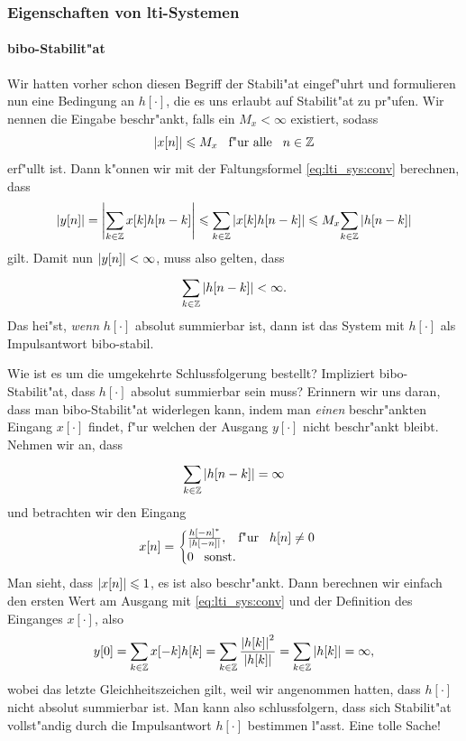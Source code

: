 \subsubsection{Eigenschaften von \texorpdfstring{\acrshort*{lti}}{LTI}-Systemen}\label{sec:lti_sys:properties}
%
\paragraph{\texorpdfstring{\gls{bibo}}{BIBO}-Stabilit"at}
Wir hatten vorher schon diesen Begriff der Stabili"at eingef"uhrt und formulieren nun eine Bedingung an $h[\cdot]$, die es uns erlaubt auf Stabilit"at zu pr"ufen.
Wir nennen die Eingabe beschr"ankt, falls ein $M_x < \infty$ existiert, sodass
\[
{\left| x[n] \right|} \leqslant M_x {\hspace{3mm} \text{f"ur alle} \hspace{3mm}} n \in \mathbb{Z}
\]
erf"ullt ist.
Dann k"onnen wir mit der Faltungsformel \eqref{eq:lti_sys:conv} berechnen, dass
\[
{\left| y[n] \right|} 
    = {\left| {\sum\limits_{k\in\mathbb{Z}}^{}{x[k] h[n-k]}} \right|} 
    \leqslant {\sum\limits_{k\in\mathbb{Z}}^{}{{\left| x[k] h[n-k] \right|}}} 
    \leqslant M_x {\sum\limits_{k\in\mathbb{Z}}^{}{{\left| h[n-k] \right|}}} 
\]
gilt.
Damit nun ${\left| y[n] \right|} < \infty$, muss also gelten, dass
\[
    {\sum\limits_{k\in\mathbb{Z}}^{}{{\left| h[n-k] \right|}}} < \infty.
\]
Das hei"st, \emph{wenn} $h[\cdot]$ absolut summierbar ist, dann ist das System mit $h[\cdot]$ als Impulsantwort \gls{bibo}-stabil.

Wie ist es um die umgekehrte Schlussfolgerung bestellt?
Impliziert \gls{bibo}-Stabilit"at, dass $h[\cdot]$ absolut summierbar sein muss?
Erinnern wir uns daran, dass man \gls{bibo}-Stabilit"at widerlegen kann, indem man \emph{einen} beschr"ankten Eingang $x[\cdot]$ findet, f"ur welchen der Ausgang $y[\cdot]$ nicht beschr"ankt bleibt.
Nehmen wir an, dass 
\[
{\sum\limits_{k\in\mathbb{Z}}^{}{{\left| h[n-k] \right|}}} = \infty
\]
und betrachten wir den Eingang
\[
x[n] = \begin{cases}
    \frac{h[-n]^\ast}{{\left| h[-n] \right|}}, {\hspace{3mm} \text{f"ur} \hspace{3mm}} h[n] \neq 0 \\
    0 {\hspace{3mm} \text{sonst.} \hspace{3mm}}
\end{cases}
\]
Man sieht, dass ${\left| x[n] \right|} \leqslant 1$, es ist also beschr"ankt.
Dann berechnen wir einfach den ersten Wert am Ausgang mit \eqref{eq:lti_sys:conv} und der Definition des Einganges $x[\cdot]$, also
\[
y[0] 
    = {\sum\limits_{k\in\mathbb{Z}}^{}{x[-k] h[k]}}
    = {\sum\limits_{k\in\mathbb{Z}}^{}{
        \frac{{\left| h[k] \right|}^2}{{\left| h[k] \right|}}
    }}
    = {\sum\limits_{k\in\mathbb{Z}}^{}{
        {\left| h[k] \right|}
    }}
    = \infty,
\]
wobei das letzte Gleichheitszeichen gilt, weil wir angenommen hatten, dass $h[\cdot]$ nicht absolut summierbar ist.
Man kann also schlussfolgern, dass sich Stabilit"at vollst"andig durch die Impulsantwort $h[\cdot]$ bestimmen l"asst.
Eine tolle Sache!
%
